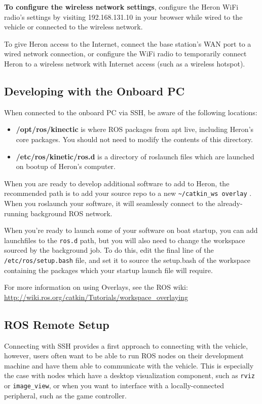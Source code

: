 \documentclass[]{clearpath-latex/clearpath-manual}
\begin{document}
\textbf{To configure the wireless network settings}, configure the Heron WiFi radio's settings by visiting 192.168.131.10 in your browser while wired to the vehicle or connected to the wireless network.


To give Heron access to the Internet, connect the base station’s WAN port to a wired network connection, or configure the WiFi radio to temporarily connect Heron to a wireless network with Internet access (such as a wireless hotspot).

\subsection{Developing with the Onboard PC}
When connected to the onboard PC via SSH, be aware of the following locations:

\begin{itemize}[nolistsep]
	\item \textbf{/opt/ros/kinectic} is where ROS packages from apt live, including Heron’s core packages. You should not need to modify the contents of this directory.
	\item \textbf{/etc/ros/kinetic/ros.d} is a directory of roslaunch files which are launched on bootup of Heron's computer.
\end{itemize}

When you are ready to develop additional software to add to Heron, the recommended path is to add your source repo to a new \lstinline{~/catkin_ws overlay} . When you roslaunch your software, it will seamlessly connect to the already-running background ROS network.

When you’re ready to launch some of your software on boat startup, you can add launchfiles to the \lstinline{ros.d} path, but you will also need to change the workspace sourced by the background job. To do this, edit the final line of the \lstinline{/etc/ros/setup.bash} file, and set it to source the setup.bash of the workspace containing the packages which your startup launch file will require.

For more information on using Overlays, see the ROS wiki: \url{http://wiki.ros.org/catkin/Tutorials/workspace_overlaying}

\subsection{ROS Remote Setup}
Connecting with SSH provides a first approach to connecting with the vehicle, however, users often want to be able to run ROS nodes on their development machine and have them able to communicate with the vehicle. This is especially the case with nodes which have a desktop visualization component, such as \lstinline{rviz} or \lstinline{image_view}, or when you want to interface with a locally-connected peripheral, such as the game controller.
\end{document}
